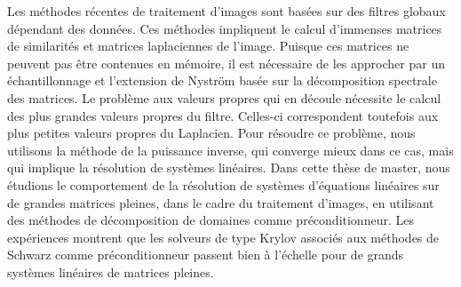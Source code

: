 Les méthodes récentes de traitement d'images sont basées sur des filtres globaux dépendant des données.
Ces méthodes impliquent le calcul d'immenses matrices de similarités et matrices laplaciennes de l'image.
Puisque ces matrices ne peuvent pas être contenues en mémoire, il est nécessaire de les approcher par un échantillonnage et l'extension de Nystr\"om basée sur la décomposition spectrale des matrices.
Le problème aux valeurs propres qui en découle nécessite le calcul des plus grandes valeurs propres du filtre.
Celles-ci correspondent toutefois aux plus petites valeurs propres du Laplacien.
Pour résoudre ce problème, nous utilisons la méthode de la puissance inverse, qui converge mieux dans ce cas, mais qui implique la résolution de systèmes linéaires.
Dans cette thèse de master, nous étudions le comportement de la résolution de systèmes d'équations linéaires sur de grandes matrices pleines, dans le cadre du traitement d'images, en utilisant des méthodes de décomposition de domaines comme préconditionneur.
Les expériences montrent que les solveurs de type Krylov associés aux méthodes de Schwarz comme préconditionneur passent bien à l'échelle pour de grands systèmes linéaires de matrices pleines.
